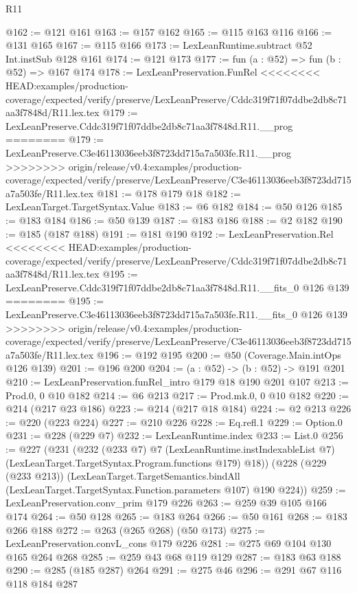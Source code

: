 \begin{lexlean}{R11}
\begin{coremodule}
{{{{{@162 := @121 @161
@163 := @157 @162
@165 := @115 @163 @116
@166 := @131 @165
@167 := @115 @166
@173 := LexLeanRuntime.subtract @52 Int.instSub @128 @161
@174 := @121 @173
@177 := fun (a : @52) => fun (b : @52) => @167 @174
@178 := LexLeanPreservation.FunRel
<<<<<<<< HEAD:examples/production-coverage/expected/verify/preserve/LexLeanPreserve/Cddc319f71f07ddbe2db8c71aa3f7848d/R11.lex.tex
@179 := LexLeanPreserve.Cddc319f71f07ddbe2db8c71aa3f7848d.R11.__prog
========
@179 := LexLeanPreserve.C3e46113036eeb3f8723dd715a7a503fe.R11.__prog
>>>>>>>> origin/release/v0.4:examples/production-coverage/expected/verify/preserve/LexLeanPreserve/C3e46113036eeb3f8723dd715a7a503fe/R11.lex.tex
@181 := @178 @179 @18
@182 := LexLeanTarget.TargetSyntax.Value
@183 := @6 @182
@184 := @50 @126
@185 := @183 @184
@186 := @50 @139
@187 := @183 @186
@188 := @2 @182
@190 := @185 (@187 @188)
@191 := @181 @190
@192 := LexLeanPreservation.Rel
<<<<<<<< HEAD:examples/production-coverage/expected/verify/preserve/LexLeanPreserve/Cddc319f71f07ddbe2db8c71aa3f7848d/R11.lex.tex
@195 := LexLeanPreserve.Cddc319f71f07ddbe2db8c71aa3f7848d.R11.__fits_0 @126 @139
========
@195 := LexLeanPreserve.C3e46113036eeb3f8723dd715a7a503fe.R11.__fits_0 @126 @139
>>>>>>>> origin/release/v0.4:examples/production-coverage/expected/verify/preserve/LexLeanPreserve/C3e46113036eeb3f8723dd715a7a503fe/R11.lex.tex
@196 := @192 @195
@200 := @50 (Coverage.Main.intOps @126 @139)
@201 := @196 @200
@204 := (a : @52) -> (b : @52) -> @191 @201
@210 := LexLeanPreservation.funRel_intro @179 @18 @190 @201 @107
@213 := Prod.{0, 0} @10 @182
@214 := @6 @213
@217 := Prod.mk.{0, 0} @10 @182
@220 := @214 (@217 @23 @186)
@223 := @214 (@217 @18 @184)
@224 := @2 @213
@226 := @220 (@223 @224)
@227 := @210 @226
@228 := Eq.refl.{1}
@229 := Option.{0}
@231 := @228 (@229 @7)
@232 := LexLeanRuntime.index
@233 := List.{0}
@256 := @227
    (@231
      (@232
        (@233 @7)
        @7
        (LexLeanRuntime.instIndexableList @7)
        (LexLeanTarget.TargetSyntax.Program.functions @179)
        @18))
    (@228
      (@229 (@233 @213))
      (LexLeanTarget.TargetSemantics.bindAll
        (LexLeanTarget.TargetSyntax.Function.parameters @107)
        @190
        @224))
@259 := LexLeanPreservation.conv_prim @179 @226
@263 := @259 @39 @105 @166 @174
@264 := @50 @128
@265 := @183 @264
@266 := @50 @161
@268 := @183 @266 @188
@272 := @263 (@265 @268) (@50 @173)
@275 := LexLeanPreservation.convL_cons @179 @226
@281 := @275 @69 @104 @130 @165 @264 @268
@285 := @259 @43 @68 @119 @129
@287 := @183 @63 @188
@290 := @285 (@185 @287) @264
@291 := @275 @46
@296 := @291 @67 @116 @118 @184 @287
}}}}}
\end{coremodule}
\end{lexlean}
